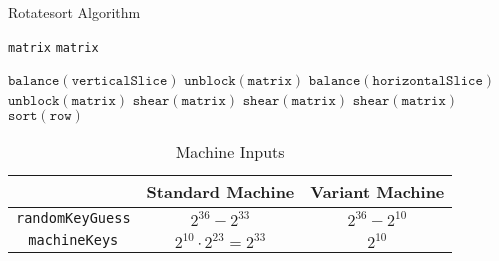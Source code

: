\documentclass{article}
\begin{document}
        \begin{algorithm}[H]
            \scriptsize
            \caption{Rotatesort Algorithm} \label{rotatesort algorithm}
            \begin{multicols}{2}
                \begin{algorithmic}[1]
                    \Require 
                        \Statex \texttt{matrix} 
                    \Ensure
                        \Statex \texttt{matrix} 
                    \Statex
    
                        \State $\texttt{balance}{\left(\texttt{verticalSlice}\right)}$ 
                    \EndFor
                    \State $\texttt{unblock}{\left(\texttt{matrix}\right)}$
                        \State $\texttt{balance}{\left(\texttt{horizontalSlice}\right)}$
                    \EndFor
                    \State $\texttt{unblock}{\left(\texttt{matrix}\right)}$
                    \State $\texttt{shear}{\left(\texttt{matrix}\right)}$
                    \State $\texttt{shear}{\left(\texttt{matrix}\right)}$
                    \State $\texttt{shear}{\left(\texttt{matrix}\right)}$
                        \State $\texttt{sort}{\left(\texttt{row}\right)}$
                    \EndFor
                \end{algorithmic}
            \end{multicols}
        \end{algorithm}

        \begin{table}[H]
            \centering
            \bgroup
            \def\arraystretch{1.5}
                \begin{tabular}{|c|c|c|}
                     \hline
                     & Standard Machine & Variant Machine \\
                     \hline
                     \texttt{randomKeyGuess} & $2^{36} - 2^{33}$ & $2^{36} - 2^{10}$ \\
                     \hline
                     \texttt{machineKeys} & $2^{10} \cdot 2^{23} = 2^{33}$ & $2^{10}$ \\
                    \hline
                \end{tabular}
            \egroup
            \caption{Machine Inputs}
            \label{tab:machine inputs}
        \end{table}


    
    
    
    \printglossaries
    
\end{document}
